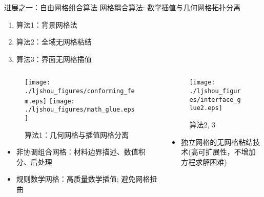 \documentclass[mathserif]{beamer}
\begin{document}
\begin{CJK}{UTF8}{gkai}
	\begin{frame}{进展之一：自由网格组合算法}
	    网格耦合算法: 数学插值与几何网格拓扑分离
    		\begin{enumerate}
        		\item 算法1：背景网格法
                \item 算法2：全域无网格粘结
                \item 算法3：界面无网格插值
    		\end{enumerate}
    		\begin{columns}
    			\begin{column}[pos]{0.5\textwidth}
    				\begin{figure}
    					\texttt{[image: ./ljshou\_figures/conforming\_fem.eps]}
    					\texttt{[image: ./ljshou\_figures/math\_glue.eps]}
    					\caption{算法1：\color{red}几何网格与插值网格分离}
    				\end{figure}
        			\begin{itemize}
        			    \item {\color{red}非协调}组合网格：材料边界描述、数值积分、后处理
                    \item {\color{red}规则}数学网格：高质量数学插值; 避免网格扭曲
        			\end{itemize}
    			\end{column}

    			\begin{column}[pos]{0.5\textwidth}
    				\begin{figure}
                	\centering
                	\texttt{[image: ./ljshou\_figures/interface\_glue2.eps]}
                	\caption{算法2, 3}
                \end{figure}
                \begin{itemize}
                \item \color{blue}独立网格的无网格粘结技术(高可扩展性，不增加方程求解困难)
                \end{itemize}
                
    			\end{column}
	    \end{columns}
	\end{frame}


\end{CJK}
\end{document}
